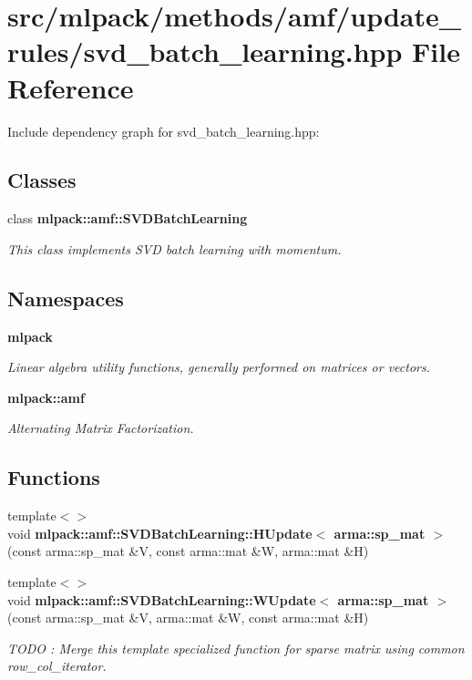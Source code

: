 \section{src/mlpack/methods/amf/update\-\_\-rules/svd\-\_\-batch\-\_\-learning.hpp File Reference}
\label{svd__batch__learning_8hpp}
Include dependency graph for svd\-\_\-batch\-\_\-learning.\-hpp\-:
\subsection*{Classes}
\begin{DoxyCompactItemize}
\item 
class {\bf mlpack\-::amf\-::\-S\-V\-D\-Batch\-Learning}
\begin{DoxyCompactList}\small\item\em This class implements S\-V\-D batch learning with momentum. \end{DoxyCompactList}\end{DoxyCompactItemize}
\subsection*{Namespaces}
\begin{DoxyCompactItemize}
\item 
{\bf mlpack}
\begin{DoxyCompactList}\small\item\em Linear algebra utility functions, generally performed on matrices or vectors. \end{DoxyCompactList}\item 
{\bf mlpack\-::amf}
\begin{DoxyCompactList}\small\item\em Alternating Matrix Factorization. \end{DoxyCompactList}\end{DoxyCompactItemize}
\subsection*{Functions}
\begin{DoxyCompactItemize}
\item 
{\footnotesize template$<$$>$ }\\void {\bf mlpack\-::amf\-::\-S\-V\-D\-Batch\-Learning\-::\-H\-Update$<$ arma\-::sp\-\_\-mat $>$} (const arma\-::sp\-\_\-mat \&V, const arma\-::mat \&W, arma\-::mat \&H)
\item 
{\footnotesize template$<$$>$ }\\void {\bf mlpack\-::amf\-::\-S\-V\-D\-Batch\-Learning\-::\-W\-Update$<$ arma\-::sp\-\_\-mat $>$} (const arma\-::sp\-\_\-mat \&V, arma\-::mat \&W, const arma\-::mat \&H)
\begin{DoxyCompactList}\small\item\em T\-O\-D\-O \-: Merge this template specialized function for sparse matrix using common row\-\_\-col\-\_\-iterator. \end{DoxyCompactList}\end{DoxyCompactItemize}
